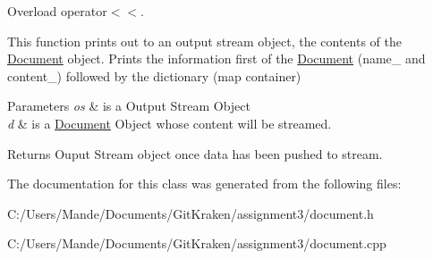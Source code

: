 Overload operator$<$$<$. 

This function prints out to an output stream object, the contents of the \hyperlink{class_document}{Document} object. Prints the information first of the \hyperlink{class_document}{Document} (name\+\_\+ and content\+\_\+) followed by the dictionary (map container)


\begin{DoxyParams}{Parameters}
{\em os} & is a Output Stream Object \\
\hline
{\em d} & is a \hyperlink{class_document}{Document} Object whose content will be streamed. \\
\hline
\end{DoxyParams}
\begin{DoxyReturn}{Returns}
Ouput Stream object once data has been pushed to stream. 
\end{DoxyReturn}


The documentation for this class was generated from the following files\+:\begin{DoxyCompactItemize}
\item 
C\+:/\+Users/\+Mande/\+Documents/\+Git\+Kraken/assignment3/document.\+h\item 
C\+:/\+Users/\+Mande/\+Documents/\+Git\+Kraken/assignment3/document.\+cpp\end{DoxyCompactItemize}
